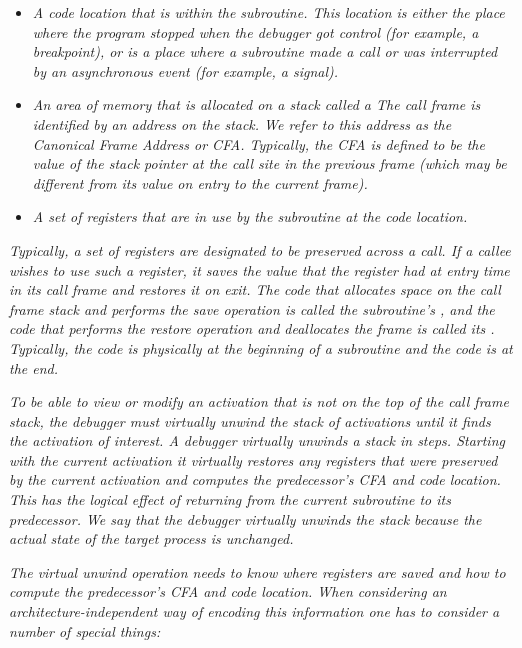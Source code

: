 \begin{itemize}
\item \textit{A code location that is within the
subroutine. This location is either the place where the program
stopped when the debugger got control (for example, a breakpoint), or
is a place where a subroutine made a call or was interrupted
by an asynchronous event (for example, a signal).}

\item \textit{An area of memory that is allocated on a stack called a
 The call frame is identified by an address
on the stack. We refer to this address as the Canonical
Frame Address or CFA. Typically, the CFA is defined to be the
value of the stack pointer at the call site in the previous
frame (which may be different from its value on entry to the
current frame).}

\item \textit{A set of registers that are in use by the subroutine
at the code location.}

\end{itemize}

\textit{Typically, a set of registers are designated to be preserved
across a call. If a callee wishes to use such a register, it
saves the value that the register had at entry time in its call
frame and restores it on exit. The code that allocates space
on the call frame stack and performs the save operation is
called the subroutine\textquoteright{s} , and the code that performs
the restore operation and deallocates the frame is called its
. Typically, the 
 code is physically at the
beginning of a subroutine and the 
 code is at the end.}

\textit{To be able to view or modify an activation that is not
on the top of the call frame stack, the debugger must
virtually unwind the stack of activations until
it finds the activation of interest.  A debugger virtually unwinds
a stack in steps. Starting with the current activation it
virtually restores any registers that were preserved by the
current activation and computes the predecessor\textquoteright{s} CFA and
code location. This has the logical effect of returning from
the current subroutine to its predecessor. We say that the
debugger virtually unwinds the stack because the actual state
of the target process is unchanged.}

\textit{The virtual unwind 
operation needs to know where registers are
saved and how to compute the predecessor\textquoteright{s} CFA and code
location. When considering an architecture-independent way
of encoding this information one has to consider a number of
special things:}


